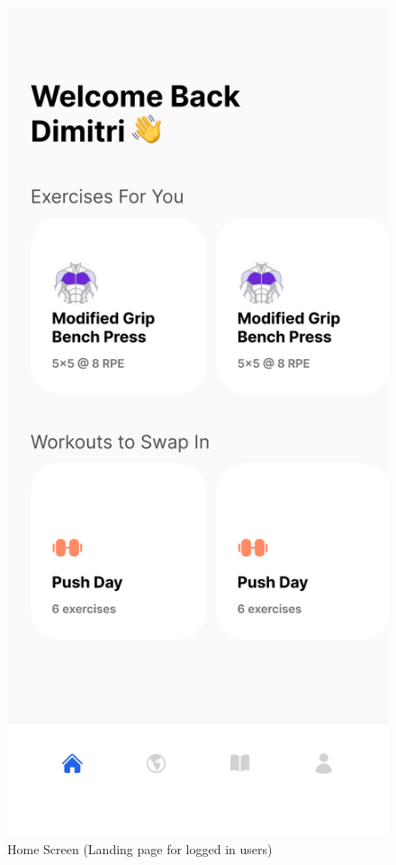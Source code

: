\documentclass[12pt, titlepage]{article}
\begin{document}
  \begin{figure}[H]
		\centering
		\includegraphics[scale=0.35]{home_screen}
		\caption{Home Screen (Landing page for logged in users)}
	\end{figure}
\end{document}

